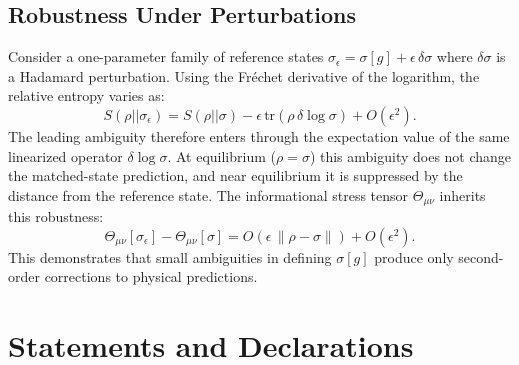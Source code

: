 \documentclass[aps,prd,twocolumn,superscriptaddress,nofootinbib,floatfix]{revtex4-2}
\begin{document}
\subsection{Robustness Under Perturbations}

Consider a one-parameter family of reference states $\sigma_\epsilon = \sigma[g] + \epsilon \, \delta\sigma$ where $\delta\sigma$ is a Hadamard perturbation. Using the Fr\'echet derivative of the logarithm, the relative entropy varies as:
\begin{equation}
    S(\rho || \sigma_\epsilon) = S(\rho || \sigma) - \epsilon \, \mathrm{tr}(\rho \, \delta\log \sigma) + O(\epsilon^2).
\end{equation}
The leading ambiguity therefore enters through the expectation value of the same linearized operator $\delta \log \sigma$. At equilibrium ($\rho=\sigma$) this ambiguity does not change the matched-state prediction, and near equilibrium it is suppressed by the distance from the reference state. The informational stress tensor $\Theta_{\mu\nu}$ inherits this robustness:
\begin{equation}
    \Theta_{\mu\nu}[\sigma_\epsilon] - \Theta_{\mu\nu}[\sigma]
    = O\!\left(\epsilon \, \|\rho-\sigma\|\right) + O(\epsilon^2).
\end{equation}
This demonstrates that small ambiguities in defining $\sigma[g]$ produce only second-order corrections to physical predictions.




\section*{Statements and Declarations}
\end{document}
